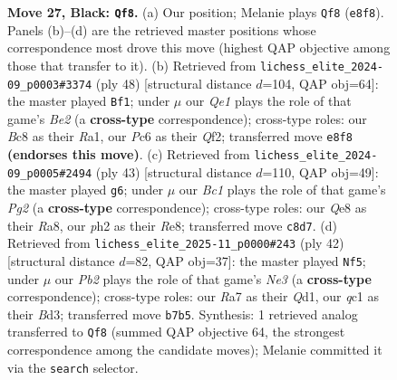 \documentclass[11pt]{article}
\begin{document}
\begin{figure}[p]
\caption{\textbf{Move 27, Black: \texttt{Qf8}.} (a) Our position; Melanie plays \texttt{Qf8} (\texttt{e8f8}). Panels (b)--(d) are the retrieved master positions whose correspondence most drove this move (highest QAP objective among those that transfer to it). (b) Retrieved from \texttt{lichess\_elite\_2024-09\_p0003\#3374} (ply 48) [structural distance $d$=104, QAP obj=64]: the master played \texttt{Bf1}; under $\mu$ our \emph{Qe1} plays the role of that game's \emph{Be2} (a \textbf{cross-type} correspondence); cross-type roles: our \emph{B}c8 as their \emph{R}a1, our \emph{P}c6 as their \emph{Q}f2; transferred move \texttt{e8f8} \textbf{(endorses this move)}. (c) Retrieved from \texttt{lichess\_elite\_2024-09\_p0005\#2494} (ply 43) [structural distance $d$=110, QAP obj=49]: the master played \texttt{g6}; under $\mu$ our \emph{Bc1} plays the role of that game's \emph{Pg2} (a \textbf{cross-type} correspondence); cross-type roles: our \emph{Q}e8 as their \emph{R}a8, our \emph{p}h2 as their \emph{R}e8; transferred move \texttt{c8d7}. (d) Retrieved from \texttt{lichess\_elite\_2025-11\_p0000\#243} (ply 42) [structural distance $d$=82, QAP obj=37]: the master played \texttt{Nf5}; under $\mu$ our \emph{Pb2} plays the role of that game's \emph{Ne3} (a \textbf{cross-type} correspondence); cross-type roles: our \emph{R}a7 as their \emph{Q}d1, our \emph{q}c1 as their \emph{B}d3; transferred move \texttt{b7b5}. Synthesis: 1 retrieved analog transferred to \texttt{Qf8} (summed QAP objective 64, the strongest correspondence among the candidate moves); Melanie committed it via the \texttt{search} selector.}
\label{fig:thought-m53}
\end{figure}

\clearpage
\end{document}
